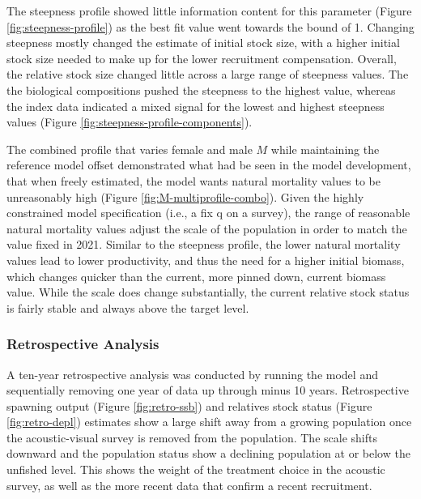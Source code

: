 \documentclass[11pt,
  english,
  letterpaper,
]{article}
\begin{document}
The steepness profile showed little information content for this parameter (Figure \ref{fig:steepness-profile}) as the best fit value went towards the bound of 1. Changing steepness mostly changed the estimate of initial stock size, with a higher initial stock size needed to make up for the lower recruitment compensation. Overall, the relative stock size changed little across a large range of steepness values. The the biological compositions pushed the steepness to the highest value, whereas the index data indicated a mixed signal for the lowest and highest steepness values (Figure \ref{fig:steepness-profile-components}).

The combined profile that varies female and male \(M\) while maintaining the reference model offset demonstrated what had be seen in the model development, that when freely estimated, the model wants natural mortality values to be unreasonably high (Figure \ref{fig:M-multiprofile-combo}). Given the highly constrained model specification (i.e., a fix q on a survey), the range of reasonable natural mortality values adjust the scale of the population in order to match the value fixed in 2021. Similar to the steepness profile, the lower natural mortality values lead to lower productivity, and thus the need for a higher initial biomass, which changes quicker than the current, more pinned down, current biomass value. While the scale does change substantially, the current relative stock status is fairly stable and always above the target level.

\hypertarget{retrospective-analysis}{%
\subsubsection{Retrospective Analysis}\label{retrospective-analysis}}

A ten-year retrospective analysis was conducted by running the model and sequentially removing one year of data up through minus 10 years. Retrospective spawning output (Figure \ref{fig:retro-ssb}) and relatives stock status (Figure \ref{fig:retro-depl}) estimates show a large shift away from a growing population once the acoustic-visual survey is removed from the population. The scale shifts downward and the population status show a declining population at or below the unfished level. This shows the weight of the treatment choice in the acoustic survey, as well as the more recent data that confirm a recent recruitment.
\end{document}
